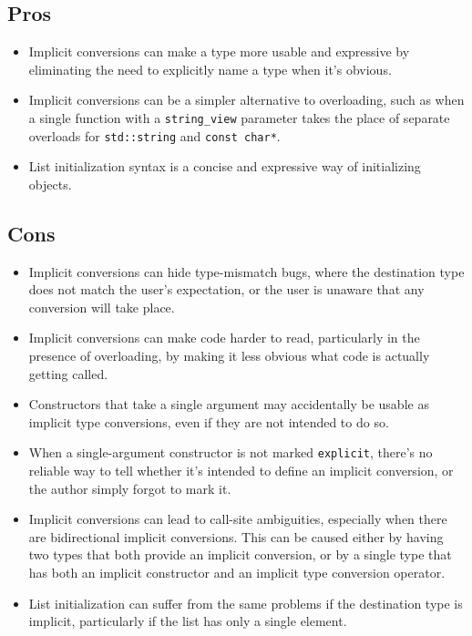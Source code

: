 \subsection{Pros}
\begin{itemize}
    \item Implicit conversions can make a type more usable and expressive by eliminating the need to explicitly name a type when it's obvious.
    \item Implicit conversions can be a simpler alternative to overloading, such as when a single function with a \texttt{string_view} parameter takes the place of separate overloads for \texttt{std::string} and \texttt{const char*}.
    \item List initialization syntax is a concise and expressive way of initializing objects.
\end{itemize}

\subsection{Cons}
\begin{itemize}
    \item Implicit conversions can hide type-mismatch bugs, where the destination type does not match the user's expectation, or the user is unaware that any conversion will take place.
    \item Implicit conversions can make code harder to read, particularly in the presence of overloading, by making it less obvious what code is actually getting called.
    \item Constructors that take a single argument may accidentally be usable as implicit type conversions, even if they are not intended to do so.
    \item When a single-argument constructor is not marked \texttt{explicit}, there's no reliable way to tell whether it's intended to define an implicit conversion, or the author simply forgot to mark it.
    \item Implicit conversions can lead to call-site ambiguities, especially when there are bidirectional implicit conversions. This can be caused either by having two types that both provide an implicit conversion, or by a single type that has both an implicit constructor and an implicit type conversion operator.
    \item List initialization can suffer from the same problems if the destination type is implicit, particularly if the list has only a single element.
\end{itemize}

